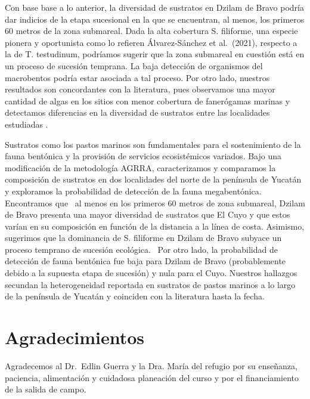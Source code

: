 \documentclass[
  authoryear,
  preprint,
  3p,
  twocolumn]{elsarticle}
\begin{document}
Con base base a lo anterior, la diversidad de sustratos en Dzilam de
Bravo podría dar indicios de la etapa sucesional en la que se
encuentran, al menos, los primeros 60 metros de la zona submareal. Dada
la alta cobertura S. filiforme, una especie pionera y oportunista como
lo refieren Álvarez-Sánchez et al.~(2021), respecto a la de T.
testudinum, podríamos sugerir que la zona submareal en cuestión está en
un proceso de sucesión temprana. La baja detección de organismos del
macrobentos podría estar asociada a tal proceso. Por otro lado, nuestros
resultados son concordantes con la literatura, pues observamos una mayor
cantidad de algas en los sitios con menor cobertura de fanerógamas
marinas \citep{sanchez2021cobertura} y detectamos diferencias en la
diversidad de sustratos entre las localidades estudiadas
\citep{garcia2010biodiversidad}.

\hfill\break
Sustratos como los pastos marinos son fundamentales para el
sostenimiento de la fauna bentónica y la provisión de servicios
ecosistémicos variados. Bajo una modificación de la metodología AGRRA,
caracterizamos y comparamos la composición de sustratos en dos
localidades del norte de la península de Yucatán y exploramos la
probabilidad de detección de la fauna megabentónica. Encontramos que~ al
menos en los primeros 60 metros de zona submareal, Dzilam de Bravo
presenta una mayor diversidad de sustratos que El Cuyo y que estos
varían en su composición en función de la distancia a la línea de costa.
Asimismo, sugerimos que la dominancia de S. filiforme en Dzilam de Bravo
subyace un proceso temprano de sucesión ecológica. ~Por otro lado, la
probabilidad de detección de fauna bentónica fue baja para Dzilam de
Bravo (probablemente debido a la supuesta etapa de sucesión) y nula para
el Cuyo. Nuestros hallazgos secundan la heterogeneidad reportada en
sustratos de pastos marinos a lo largo de la península de Yucatán y
coinciden con la literatura hasta la fecha.

\hypertarget{agradecimientos}{%
\section{Agradecimientos}\label{agradecimientos}}

Agradecemos al Dr.~Edlin Guerra y la Dra. María del refugio por su
enseñanza, paciencia, alimentación y cuidadosa planeación del curso y
por el financiamiento de la salida de campo.~


\renewcommand\refname{References}
  
\end{document}
